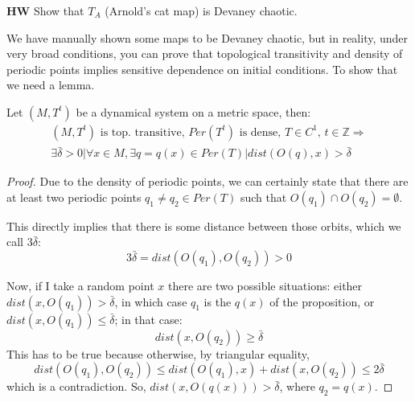 \textbf{HW} Show that $T_A$ (Arnold's cat map) is Devaney chaotic.

We have manually shown some maps to be Devaney chaotic, but in reality, under very broad conditions, you can prove that topological transitivity and density of periodic points implies sensitive dependence on initial conditions. To show that we need a lemma.

\begin{lemma}
    Let $(M, T^t)$ be a dynamical system on a metric space, then: \begin{align*}
        (M, T^t)\text{ is top. transitive, }Per(T^t)\text{ is dense, }T\in C^1,\,t\in\mathbb{Z}\Rightarrow \\
        \exists\bar{\delta}>0| \forall x\in M, \exists q=q(x)\in Per(T)|dist(O(q),x)>\bar{\delta}
    \end{align*}
\end{lemma}
\begin{proof}
    Due to the density of periodic points, we can certainly state that there are at least two periodic points $q_1\neq q_2 \in Per(T)$ such that $O(q_1)\cap O(q_2)=\emptyset$.
    
    This directly implies that there is some distance between those orbits, which we call $3\bar{\delta}$: \begin{equation*}
    3\bar{\delta}=dist(O(q_1), O(q_2))>0
    \end{equation*}

    Now, if I take a random point $x$ there are two possible situations: either $dist(x, O(q_1))> \bar{\delta}$, in which case $q_1$ is the $q(x)$ of the proposition, or $dist(x, O(q_1))\leq \bar{\delta}$; in that case: \begin{equation*}
    dist(x, O(q_2))\geq \bar{\delta}
    \end{equation*} 
    This has to be true because otherwise, by triangular equality, \begin{equation*}
        dist(O(q_1), O(q_2))\leq dist(O(q_1), x)+dist(x, O(q_2))\leq 2\bar{\delta}
    \end{equation*}
    which is a contradiction. So, $dist(x, O(q(x)))>\bar{\delta}$, where $q_2=q(x)$.
\end{proof}

